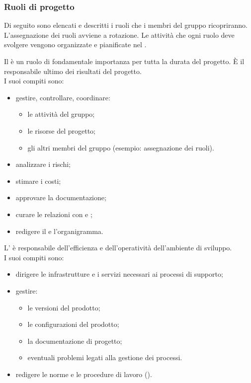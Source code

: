\subsubsection{Ruoli di progetto}
Di seguito sono elencati e descritti i ruoli che i membri del gruppo ricopriranno. L'assegnazione dei ruoli avviene a rotazione. Le attività che ogni ruolo deve svolgere vengono organizzate e pianificate nel \PdP{}. 

Il \respProg{} è un ruolo di fondamentale importanza per tutta la durata del progetto. È il responsabile ultimo dei risultati del progetto.\\I suoi compiti sono:
\begin{itemize}
\item gestire, controllare, coordinare:
\begin{itemize}
\item le attività del gruppo;
\item le risorse del progetto;
\item gli altri membri del gruppo (esempio: assegnazione dei ruoli).
\end{itemize}
\item analizzare i rischi;
\item stimare i costi;
\item approvare la documentazione;
\item curare le relazioni con \proponProg{} e \commitProg{};
\item redigere il \PdP{} e l'organigramma.
\end{itemize} 

L'\ammProg{} è responsabile dell'efficienza e dell'operatività dell'ambiente di sviluppo.\\I suoi compiti sono: 
\begin{itemize}
\item dirigere le infrastrutture e i servizi necessari ai processi di supporto; 
\item gestire:
\begin{itemize}
\item le versioni del prodotto;
\item le configurazioni del prodotto;
\item la documentazione di progetto;
\item eventuali problemi legati alla gestione dei processi.
\end{itemize} 
\item redigere le norme e le procedure di lavoro (\NdP{}).
\end{itemize}

